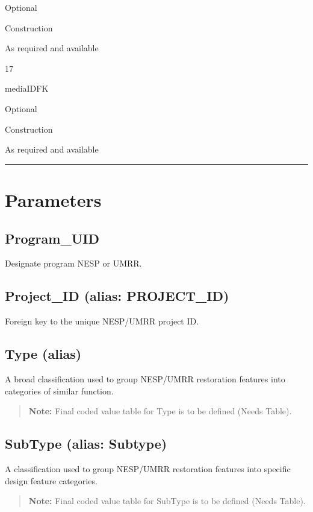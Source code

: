 \documentclass[
  letterpaper,
  DIV=11,
  numbers=noendperiod]{scrreprt}
\begin{document}
Optional

Construction

As required and available

17

mediaIDFK

Optional

Construction

As required and available

\begin{center}\rule{0.5\linewidth}{0.5pt}\end{center}

\section{Parameters}\label{parameters-18}

\subsection{Program\_UID}\label{program_uid-18}

Designate program NESP or UMRR.

\subsection{Project\_ID (alias:
PROJECT\_ID)}\label{project_id-alias-project_id-18}

Foreign key to the unique NESP/UMRR project ID.

\subsection{Type (alias)}\label{type-alias-17}

A broad classification used to group NESP/UMRR restoration features into
categories of similar function.

\begin{quote}
\textbf{Note:} Final coded value table for Type is to be defined (Needs
Table).
\end{quote}

\subsection{SubType (alias: Subtype)}\label{subtype-alias-subtype-18}

A classification used to group NESP/UMRR restoration features into
specific design feature categories.

\begin{quote}
\textbf{Note:} Final coded value table for SubType is to be defined
(Needs Table).
\end{quote}
\end{document}

